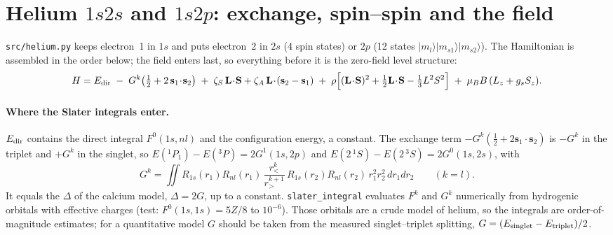 \section{Helium $1s2s$ and $1s2p$: exchange, spin--spin and the field}
\texttt{src/helium.py} keeps electron~1 in $1s$ and puts electron~2 in $2s$ (4 spin states) or $2p$ (12 states $|m_l\rangle|m_{s1}\rangle|m_{s2}\rangle$). The Hamiltonian is assembled in the order below; the field enters last, so everything before it is the zero-field level structure:
\begin{equation}
H=E_{\rm dir}\;-\;G^{k}\bigl(\tfrac12+2\,\mathbf s_1\!\cdot\!\mathbf s_2\bigr)\;+\;\zeta_S\,\mathbf L\!\cdot\!\mathbf S+\zeta_A\,\mathbf L\!\cdot\!(\mathbf s_2-\mathbf s_1)\;+\;\rho\Bigl[(\mathbf L\!\cdot\!\mathbf S)^2+\tfrac12\mathbf L\!\cdot\!\mathbf S-\tfrac13L^2S^2\Bigr]\;+\;\mu_BB\,(L_z+g_sS_z).
\end{equation}
\paragraph{Where the Slater integrals enter.} $E_{\rm dir}$ contains the direct integral $F^0(1s,nl)$ and the configuration energy, a constant. The exchange term $-G^k(\tfrac12+2\mathbf s_1\!\cdot\!\mathbf s_2)$ is $-G^k$ in the triplet and $+G^k$ in the singlet, so $E(^1\!P_1)-E(^3\!P)=2G^1(1s,2p)$ and $E(2\,^1\!S)-E(2\,^3\!S)=2G^0(1s,2s)$, with
\begin{equation}
G^k=\iint R_{1s}(r_1)R_{nl}(r_1)\,\frac{r_<^k}{r_>^{k+1}}\,R_{1s}(r_2)R_{nl}(r_2)\,r_1^2r_2^2\,dr_1dr_2\qquad(k=l).
\end{equation}
It equals the $\Delta$ of the calcium model, $\Delta=2G$, up to a constant. \texttt{slater\_integral} evaluates $F^k$ and $G^k$ numerically from hydrogenic orbitals with effective charges (test: $F^0(1s,1s)=5Z/8$ to $10^{-6}$). Those orbitals are a crude model of helium, so the integrals are order-of-magnitude estimates; for a quantitative model $G$ should be taken from the measured singlet--triplet splitting, $G=(E_{\rm singlet}-E_{\rm triplet})/2$.

